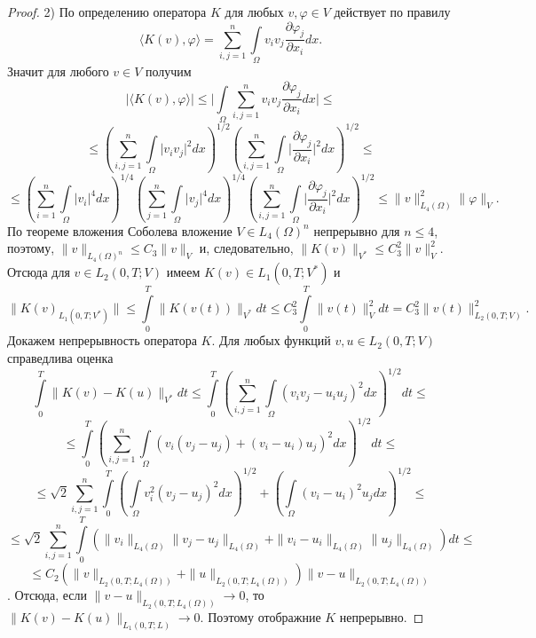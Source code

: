 \begin{proof}
        2) По определению оператора $K$ для любых $v,\varphi\in V$ действует по правилу
        $$\langle K(v),\varphi \rangle = \sum_{i,j=1}^{n}\int\limits_\Omega v_i v_j \frac{\partial \varphi_j}{\partial x_i}dx.$$
        Значит для любого $v\in V$ получим
        $$\bigg|\langle K(v),\varphi \rangle\bigg|\le\bigg|\int\limits_{\Omega}\sum_{i,j=1}^{n}v_i v_j \frac{\partial \varphi_j}{\partial x_i}dx\bigg|\le$$
        $$\le(\sum_{i,j=1}^{n}\int\limits_{\Omega}\bigg|v_i v_j\bigg|^2 dx)^{1/2}(\sum_{i,j=1}^{n}\int\limits_{\Omega}\bigg|\frac{\partial \varphi_j}{\partial x_i}\bigg|^2 dx)^{1/2}\le$$
        $$\le(\sum_{i=1}^{n}\int\limits_{\Omega}\bigg|v_i\bigg|^4 dx)^{1/4}(\sum_{j=1}^{n}\int\limits_{\Omega}\bigg|v_j\bigg|^4 dx)^{1/4}
        (\sum_{i,j=1}^{n}\int\limits_{\Omega}\bigg|\frac{\partial \varphi_j}{\partial x_i}\bigg|^2 dx)^{1/2}\le
        \|v\|^2_{L_4(\Omega)}\|\varphi\|_V.$$
        По теореме вложения Соболева вложение $V\in L_4(\Omega)^n$ непрерывно для $n\le 4$, поэтому, $\|v\|_{L_4(\Omega)^n}\le C_3\|v\|_V$ и, следовательно,
        $\|K(v)\|_{V^*}\le C_3^2\|v\|^2_V.$ Отсюда для $v\in L_2(0,T;V)$ имеем $K(v)\in L_1(0,T;V^*)$ и 
        $$\|K(v)_{L_1(0,T;V^*)}\|\le\int\limits_0^T\|K(v(t))\|_{V^*} dt\le C_3^2\int\limits_0^T\|v(t)\|_V^2 dt=C_3^2\|v(t)\|_{L_2(0,T;V)}^2.$$
        Докажем непрерывность оператора $K$. Для любых функций\linebreak
        $v,u\in L_2(0,T;V)$ справедлива оценка
        $$\int\limits_0^T\|K(v)-K(u)\|_{V^*} dt\le\int\limits_0^T(\sum_{i,j=1}^{n}\int\limits_\Omega (v_iv_j-u_iu_j)^2dx)^{1/2} dt\le$$
        $$\le\int\limits_0^T(\sum_{i,j=1}^{n}\int\limits_\Omega (v_i(v_j-u_j)+(v_i-u_i)u_j)^2dx)^{1/2}dt\le$$
        $$\le\sqrt2\sum_{i,j=1}^{n}\int\limits_0^T (\int\limits_{\Omega}v^2_i(v_j-u_j)^2dx)^{1/2}+
        (\int\limits_{\Omega}(v_i-u_i)^2u_j dx)^{1/2}\le$$
        $$\le\sqrt2\sum_{i,j=1}^{n}\int\limits_0^T(\|v_i\|_{L_4(\Omega)}\|v_j-u_j\|_{L_4(\Omega)}
        +\|v_i-u_i\|_{L_4(\Omega)}\|u_j\|_{L_4(\Omega)})dt\le$$
        $$\le C_2(\|v\|_{L_2(0,T;L_4(\Omega))}+\|u\|_{L_2(0,T;L_4(\Omega))})\|v-u\|_{L_2(0,T;L_4(\Omega))}$$.
        Отсюда, если $\|v-u\|_{L_2(0,T;L_4(\Omega))}\rightarrow 0$, то $\|K(v)-K(u)\|_{L_1(0,T;L)}\rightarrow 0$. Поэтому отображние $K$ непрерывно.
        
\end{proof}

